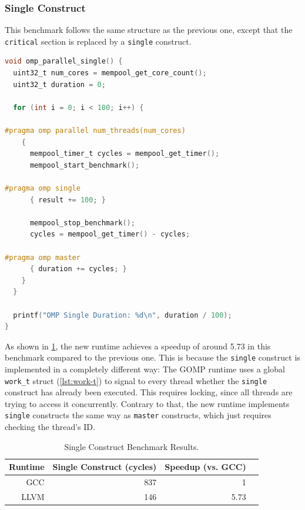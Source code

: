 \subsubsection{Single Construct}

This benchmark follows the same structure as the previous one, except that the \texttt{critical}
section is replaced by a \texttt{single} construct.

\begin{lstlisting}[language=C, caption={Single Benchmark},
                   label={lst:benchmark-single}]
void omp_parallel_single() {
  uint32_t num_cores = mempool_get_core_count();
  uint32_t duration = 0;

  for (int i = 0; i < 100; i++) {

#pragma omp parallel num_threads(num_cores)
    {
      mempool_timer_t cycles = mempool_get_timer();
      mempool_start_benchmark();

#pragma omp single
      { result += 100; }

      mempool_stop_benchmark();
      cycles = mempool_get_timer() - cycles;

#pragma omp master
      { duration += cycles; }
    }
  }

  printf("OMP Single Duration: %d\n", duration / 100);
}
\end{lstlisting}

As shown in \cref{tbl:single}, the new runtime achieves a speedup of around 5.73 in this benchmark
compared to the previous one. This is because the \texttt{single} construct is implemented in a
completely different way: The GOMP runtime uses a global \texttt{work_t} struct (\cref{lst:work-t})
to signal to every thread whether the \texttt{single} construct has already been executed. This
requires locking, since all threads are trying to access it concurrently. Contrary to that, the new
runtime implements \texttt{single} constructs the same way as \texttt{master} constructs, which just
requires checking the thread's ID.

\begin{table}[h]
	\centerfloat
	\begin{tabular}{ r r r r }
		\toprule
		\textbf{Runtime} & \textbf{Single Construct (cycles)} & \textbf{Speedup (vs. GCC)} \\
		\midrule
		GCC              & 837                                & 1                          \\
		LLVM             & 146                                & 5.73                       \\
		\bottomrule
	\end{tabular}
	\caption{Single Construct Benchmark Results.}%
	\label{tbl:single}
\end{table}

